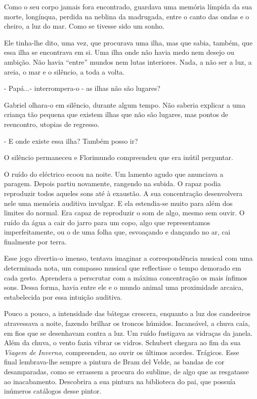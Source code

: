 Como o seu corpo jamais fora encontrado, guardava uma memória límpida da
sua morte, longínqua, perdida na neblina da madrugada, entre o canto das
ondas e o cheiro, a luz do mar. Como se tivesse sido um sonho.

Ele tinha-lhe dito, uma vez, que procurava uma ilha, mas que sabia,
também, que essa ilha se encontrava em si. Uma ilha onde não havia medo
nem desejo ou ambição. Não havia ``entre'' mundos nem lutas interiores.
Nada, a não ser a luz, a areia, o mar e o silêncio, a toda a volta.

- Papá...- interrompera-o - as ilhas não são lugares?

Gabriel olhara-o em silêncio, durante algum tempo. Não saberia explicar
a uma criança tão pequena que existem ilhas que não são lugares, mas
pontos de reencontro, utopias de regresso.

- E onde existe essa ilha? Também posso ir?

O silêncio permaneceu e Florimundo compreendeu que era inútil perguntar.

O ruído do eléctrico ecoou na noite. Um lamento agudo que anunciava a
paragem. Depois partiu novamente, rangendo na subida. O rapaz podia
reproduzir todos aqueles sons até à exaustão. A sua concentração
desenvolvera nele uma memória auditiva invulgar. E ela estendia-se muito
para além dos limites do normal. Era capaz de reproduzir o som de algo,
mesmo sem ouvir. O ruído da água a cair do jarro para um copo, algo que
representamos imperfeitamente, ou o de uma folha que, esvoaçando e
dançando no ar, cai finalmente por terra.

Esse jogo divertia-o imenso, tentava imaginar a correspondência musical
com uma determinada nota, um compasso musical que reflectisse o tempo
demorado em cada gesto. Aprendera a perscrutar com a máxima concentração
os mais ínfimos sons. Dessa forma, havia entre ele e o mundo animal uma
proximidade arcaica, estabelecida por essa intuição auditiva.

Pouco a pouco, a intensidade das bátegas crescera, enquanto a luz dos
candeeiros atravessava a noite, fazendo brilhar os troncos húmidos.
Incansável, a chuva caía, em fios que se desenhavam contra a luz. Um
ruído fustigava as vidraças da janela. Além da chuva, o vento fazia
vibrar os vidros. Schubert chegara ao fim da sua \emph{Viagem de
Inverno}, compreendeu, ao ouvir os últimos acordes. Trágicos. Esse final
lembrava-lhe sempre a pintura de Bram del Velde, as bandas de cor
desamparadas, como se errassem a procura do sublime, de algo que as
resgatasse ao inacabamento. Descobrira a sua pintura na biblioteca do
pai, que possuía inúmeros catálogos desse pintor.

